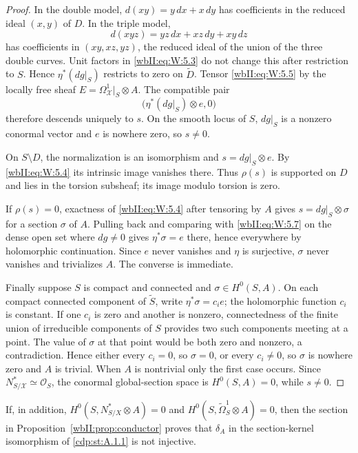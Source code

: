 \begin{proof}
In the double model, $d(xy)=y\,dx+x\,dy$ has coefficients in the reduced
ideal $(x,y)$ of $D$.  In the triple model,
\[
d(xyz)=yz\,dx+xz\,dy+xy\,dz
\]
has coefficients in $(xy,xz,yz)$, the reduced ideal of the union of the
three double curves.  Unit factors in \eqref{wbII:eq:W:5.3} do not change this after
restriction to $S$.  Hence $\eta^*(dg|_S)$ restricts to zero on
$\widetilde D$.  Tensor \eqref{wbII:eq:W:5.5} by the locally free sheaf
$E=\Omega^1_{\mathcal X}|_S\otimes A$.  The compatible pair
\[
\bigl(\eta^*(dg|_S)\otimes e,0\bigr)
\]
therefore descends uniquely to $s$.  On the smooth locus of $S$, $dg|_S$
is a nonzero conormal vector and $e$ is nowhere zero, so $s\ne0$.

On $S\setminus D$, the normalization is an isomorphism and
$s=dg|_S\otimes e$.  By \eqref{wbII:eq:W:5.4} its intrinsic image vanishes there.  Thus
$\rho(s)$ is supported on $D$ and lies in the torsion subsheaf; its image
modulo torsion is zero.

If $\rho(s)=0$, exactness of \eqref{wbII:eq:W:5.4} after tensoring by $A$ gives
$s=dg|_S\otimes\sigma$ for a section $\sigma$ of $A$.  Pulling back and
comparing with \eqref{wbII:eq:W:5.7} on the dense open set where $dg\ne0$ gives
$\eta^*\sigma=e$ there, hence everywhere by holomorphic continuation.
Since $e$ never vanishes and $\eta$ is surjective, $\sigma$ never vanishes
and trivializes $A$.  The converse is immediate.

Finally suppose $S$ is compact and connected and $\sigma\in H^0(S,A)$.  On each compact
connected component of $\widetilde S$, write
$\eta^*\sigma=c_i e$; the holomorphic function $c_i$ is constant.  If one
$c_i$ is zero and another is nonzero, connectedness of the finite union of
irreducible components of $S$ provides two such components meeting at a
point.  The value of $\sigma$ at that point would be both zero and nonzero,
a contradiction.  Hence either every $c_i=0$, so $\sigma=0$, or every
$c_i\ne0$, so $\sigma$ is nowhere zero and $A$ is trivial.  When $A$ is
nontrivial only the first case occurs.  Since
$N^*_{S/\mathcal X}\simeq\mathcal O_S$, the conormal global-section space is
$H^0(S,A)=0$, while $s\ne0$.
\end{proof}

\begin{corollary}
\label{wbII:cor:normal-crossing-kernel}
If, in addition, $H^0(S,N^*_{S/X}\otimes A)=0$ and
$H^0(S,\widetilde\Omega^1_S\otimes A)=0$, then the section in
Proposition~\ref{wbII:prop:conductor} proves that $\delta_A$ in
the section-kernel isomorphism of \cref{cdp:st:A.1.1} is not injective.
\end{corollary}


